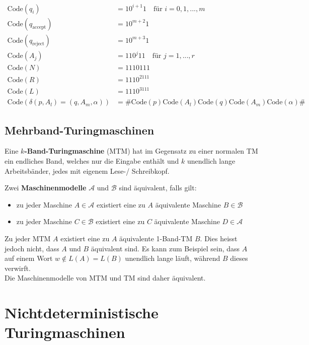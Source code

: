 \documentclass[11pt]{article}
\newcommand{\code}{\text{Code}}
\begin{document}
\begin{equation*}
\begin{split}
	\code(q_i) & = 10^{i+1}1 \quad\text{f{\"u}r } i = 0,1,...,m \\
	\code(q_\text{accept}) & = 10^{m+2}1 \\
	\code(q_\text{reject}) & = 10^{m+3}1 \\
	\code(A_j) & = 110^j11 \quad\text{f{\"u}r } j = 1,...,r \\
	\code(N) & = 1110111 \\
	\code(R) & = 1110^2111 \\
	\code(L) & = 1110^3111 \\
	\code(\delta(p, A_l) = (q, A_m, \alpha)) & = \#\code(p)\code(A_l)\code(q)\code(A_m)\code(\alpha)\#
\end{split}
\end{equation*}

\subsection{Mehrband-Turingmaschinen}

Eine \textbf{$k$-Band-Turingmaschine} (MTM) hat im Gegensatz zu einer normalen TM ein endliches Band, welches nur die Eingabe enth{\"a}lt und $k$ unendlich lange Arbeitsb{\"a}nder, jedes mit eigenem Lese-/ Schreibkopf.

Zwei \textbf{Maschinenmodelle} $\mathcal{A}$ und $\mathcal{B}$ sind {\"a}quivalent, falls gilt:
\begin{itemize}[noitemsep]
	\item zu jeder Maschine $A \in \mathcal{A}$ existiert eine zu $A$ {\"a}quivalente Maschine $B \in \mathcal{B}$
	\item zu jeder Maschine $C \in \mathcal{B}$ existiert eine zu $C$ {\"a}quivalente Maschine $D \in \mathcal{A}$
\end{itemize}

Zu jeder MTM $A$ existiert eine zu $A$ {\"a}quivalente 1-Band-TM $B$. Dies heisst jedoch nicht, dass $A$ und $B$ {\"a}quivalent sind. Es kann zum Beispiel sein, dass $A$ auf einem Wort $w \not\in L(A) = L(B)$ unendlich lange l{\"a}uft, w{\"a}hrend $B$ dieses verwirft. \\
Die Maschinenmodelle von MTM und TM sind daher {\"a}quivalent.

\section{Nichtdeterministische Turingmaschinen}
\end{document}
